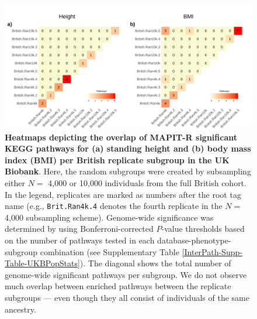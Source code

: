 \documentclass[10pt]{article}
\begin{document}
\begin{landscape}
\begin{figure}[htbp]
\centering
\includegraphics[scale=.2]{Images/Supp/InterPath_Supp_Figure_BritReps_Heatplots_KEGG_vs4.png}
\caption{\textbf{Heatmaps depicting the overlap of MAPIT-R significant KEGG pathways for (a) standing height and (b) body mass index (BMI) per British replicate subgroup in the UK Biobank}. Here, the random subgroups were created by subsampling either $N =$ 4,000 or 10,000 individuals from the full British cohort. In the legend, replicates are marked as numbers after the root tag name (e.g., \texttt{Brit.Ran4k.4} denotes the fourth replicate in the $N =$ 4,000 subsampling scheme). Genome-wide significance was determined by using Bonferroni-corrected $P$-value thresholds based on the number of pathways tested in each database-phenotype-subgroup combination (see Supplementary Table \ref{InterPath-Supp-Table-UKBPopStats}). The diagonal shows the total number of genome-wide significant pathways per subgroup. We do not observe much overlap between enriched pathways between the replicate subgroups --- even though they all consist of individuals of the same ancestry.}
\label{InterPath-Supp-Figure-BritReps-Heatplots-AllPaths-KEGG}
\end{figure}
\clearpage
\end{landscape}
\end{document}
